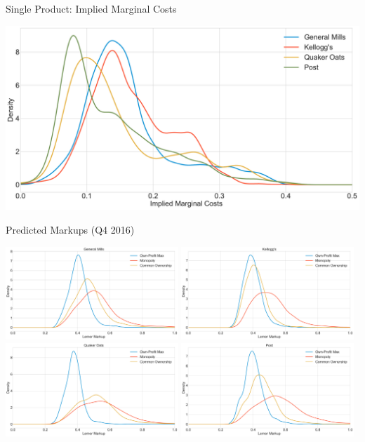 \documentclass[handout, serif, aspectratio=169, 10pt]{beamer}
\begin{document}
\begin{frame}[plain]{Single Product: Implied Marginal Costs}
\begin{center}
\includegraphics[height =0.8\textheight]{figures/mu_all_bertrand_real.pdf}
\end{center}
\end{frame}



\begin{frame}[plain]{Predicted Markups (Q4 2016)}
\begin{center}
\includegraphics[width = 6.5cm]{figures/mu_gm_real.pdf}
\includegraphics[width = 6.5cm]{figures/mu_kel_real.pdf}\\
\includegraphics[width = 6.5cm]{figures/mu_qkr_real.pdf}
\includegraphics[width = 6.5cm]{figures/mu_post_real.pdf}
\end{center}
\end{frame}
\end{document}
